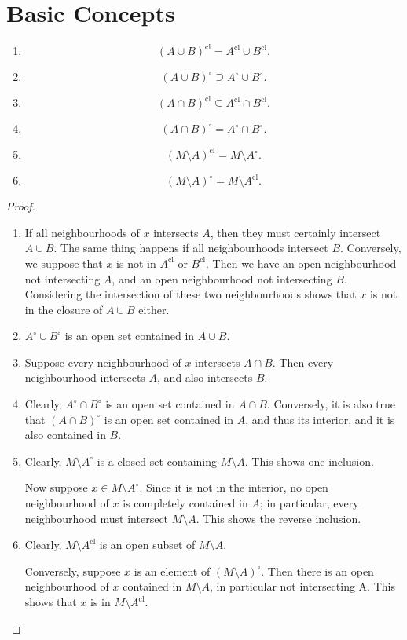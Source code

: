 \documentclass[twoside,symmetric, openany, 12pt]{./tuftebook}
\theoremstyle{definition}
\theoremstyle{definition}
\theoremstyle{definition}
\newenvironment{parts}{\begin{enumerate}[label=(\alph*)]}{\end{enumerate}}
\begin{document}
	\section{Basic Concepts}
	\begin{Theorem}
		\noindent
		\begin{parts}
			\item
			\[(A\cup B)^\text{cl}=A^\text{cl}\cup B^\text{cl}.\]
			\item 
			\[
			(A\cup B)^{\circ}\supseteq A^\circ \cup B^\circ
			.\] 
			\item \[
			(A\cap B)^\text{cl}\subseteq A^\text{cl}\cap B^\text{cl}
			.\]
			\item 	\[
			(A\cap B)^\circ = A^\circ \cap B^\circ
			.\] 
			\item \[
			(M\setminus A)^\text{cl}=M\setminus A^{\circ}
			.\]
			\item \[
			(M\setminus A)^\circ = M \setminus A^\text{cl}
			.\] 
		\end{parts}
	\end{Theorem}
\begin{proof}
	\begin{parts}
		\item If all neighbourhoods of $x$ intersects $A$, then they must certainly intersect $A\cup B$. The same thing happens if all neighbourhoods intersect $B$. Conversely, we suppose that $x$ is not in $A^\text{cl}$ or $B^\text{cl}$. Then we have an open neighbourhood not intersecting $A$, and an open neighbourhood not intersecting $B$. Considering the intersection of these two neighbourhoods shows that $x$ is not in the closure of $A\cup B$ either.
		\item $A^\circ\cup B^\circ$ is an open set contained in $A\cup B$.
		\item Suppose every neighbourhood of $x$ intersects $A\cap B$. Then every neighbourhood intersects $A$, and also intersects $B$.
		\item Clearly, $A^\circ \cap B^\circ$ is an open set contained in $A\cap B$. Conversely, it is also true that $(A\cap B)^\circ$ is an open set contained in $A$, and thus its interior, and it is also contained in $B$.
		\item Clearly, $M \setminus A^\circ$ is a closed set containing $M\setminus A$. This shows one inclusion.
		
		Now suppose $x\in M \setminus A^\circ$. Since it is not in the interior, no open neighbourhood of $x$ is completely contained in $A$; in particular, every neighbourhood must intersect $M\setminus A$. This shows the reverse inclusion.
		\item Clearly, $M\setminus A^\text{cl}$ is an open subset of $M \setminus A$.
		
		Conversely, suppose $x$ is an element of $(M \setminus A)^\circ$. Then there is an open neighbourhood of $x$ contained in $M \setminus A$, in particular not intersecting A. This shows that $x$ is in $M \setminus A^\text{cl}$.\qedhere
	\end{parts}
\end{proof}
\end{document}
